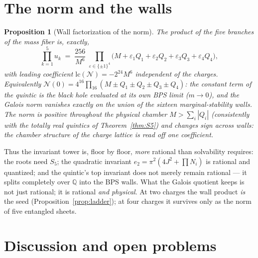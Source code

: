 \documentclass[11pt]{article}
\newtheorem{proposition}[theorem]{Proposition}
\theoremstyle{definition}
\theoremstyle{remark}
\newcommand{\Q}{\mathbb{Q}}
\begin{document}
\section{The norm and the walls}
\label{sec:walls}

\begin{proposition}[Wall factorization of the norm]
\label{prop:walls}
The product of the five branches of the mass fiber is, exactly,
\begin{equation}
\prod_{k=1}^{5}u_k \;=\;
\frac{256}{M^{6}}\;
\prod_{\varepsilon\in\{\pm1\}^4}\bigl(M+\varepsilon_1Q_1+\varepsilon_2Q_2
+\varepsilon_3Q_3+\varepsilon_4Q_4\bigr),
\end{equation}
with leading coefficient $\mathrm{lc}(\mathcal N)=-2^{24}M^6$ independent of
the charges. Equivalently $\mathcal N(0)=4^{16}\prod_{16}(M\pm Q_1\pm Q_2\pm
Q_3\pm Q_4)$: the constant term of the quintic is the black hole evaluated at
its own BPS limit ($m\to0$), and the Galois norm vanishes exactly on the union
of the sixteen marginal-stability walls. The norm is positive throughout the
physical chamber $M>\sum_i|Q_i|$ (consistently with the totally real quintics
of Theorem~\ref{thm:S5}) and changes sign across walls: the chamber structure
of the charge lattice is read off one coefficient.
\end{proposition}

Thus the invariant tower is, floor by floor, \emph{more} rational than
solvability requires: the roots need $S_5$; the quadratic invariant
$e_2=\pi^2(4J^2+\prod N_i)$ is rational and quantized; and the quintic's top
invariant does not merely remain rational --- it splits completely over $\Q$
into the BPS walls. What the Galois quotient keeps is not just rational; it is
rational \emph{and physical}. At two charges the wall product \emph{is} the
seed (Proposition~\ref{prop:ladder}); at four charges it survives only as the
norm of five entangled sheets.

\section{Discussion and open problems}
\label{sec:discussion}
\end{document}

